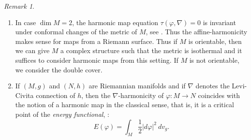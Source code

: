 \documentclass[12pt]{amsart}
\theoremstyle{definition}
\theoremstyle{remark}
\newtheorem{Remark}[Theorem]{Remark}
\numberwithin{equation}{section}
\begin{document}
\begin{Remark}\label{rm:Harmonic}
\mbox{}
\begin{enumerate}
\item In case $\dim M=2$, the 
 harmonic map equation $\tau(\varphi, \nabla)=0$ is 
 invariant under conformal changes of the metric of $M$, 
 see \cite{EL}.
 Thus the affine-harmonicity makes 
 sense for maps from a Riemann surface.
 Thus if $M$ is orientable, then we can give $M$ 
 a complex structure such that the metric is isothermal and 
 it suffices to consider harmonic maps from this setting. 
 If $M$ is not orientable, we consider the double cover.
\item 
 If $(M,g)$ and $(N,h)$ are Riemannian manifolds and if $\nabla$ 
 denotes the Levi-Civita connection of $h$, 
 then the $\nabla$-harmonicity of $\varphi:M\to N$ coincides 
 with the notion of a harmonic map in the classical sense, 
 that is, it is a critical point of the \textit{energy functional}, 
 \cite{EL}: 
\begin{equation*}
 E(\varphi)=\int_{M}\frac{1}{2} |d\varphi|^{2}\>dv_g.
\end{equation*}
\end{enumerate}
\end{Remark}
\end{document}

